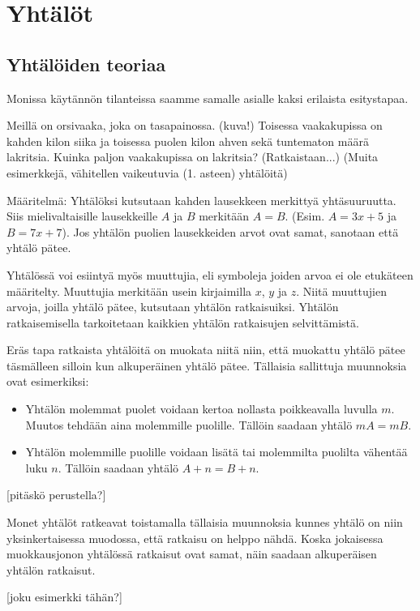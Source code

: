 %
\part{Yhtälöt}
\chapter{Yhtälöiden teoriaa}
Monissa käytännön tilanteissa saamme samalle asialle kaksi erilaista esitystapaa.

\begin{esimerkki}
Meillä on orsivaaka, joka on tasapainossa. (kuva!) Toisessa vaakakupissa on kahden kilon siika ja toisessa puolen kilon ahven sekä tuntematon määrä lakritsia. Kuinka paljon vaakakupissa on lakritsia? (Ratkaistaan...) (Muita esimerkkejä, vähitellen vaikeutuvia (1. asteen) yhtälöitä)
\end{esimerkki}

Määritelmä: Yhtälöksi kutsutaan kahden lausekkeen merkittyä yhtäsuuruutta. Siis mielivaltaisille lausekkeille $A$ ja $B$ merkitään $A=B$. (Esim. $A=3x+5$ ja $B=7x+7$). Jos yhtälön puolien lausekkeiden arvot ovat samat, sanotaan että yhtälö pätee. 

Yhtälössä voi esiintyä myös muuttujia, eli symboleja joiden arvoa ei ole etukäteen määritelty. Muuttujia merkitään usein kirjaimilla $x$, $y$ ja $z$. Niitä muuttujien arvoja, joilla yhtälö pätee, kutsutaan yhtälön ratkaisuiksi. Yhtälön ratkaisemisella tarkoitetaan kaikkien yhtälön ratkaisujen selvittämistä.

Eräs tapa ratkaista yhtälöitä on muokata niitä niin, että muokattu yhtälö pätee täsmälleen silloin kun alkuperäinen yhtälö pätee. Tällaisia sallittuja muunnoksia ovat esimerkiksi:
\begin{itemize}
\item Yhtälön molemmat puolet voidaan kertoa nollasta poikkeavalla luvulla $m$. Muutos tehdään aina molemmille puolille. Tällöin saadaan yhtälö $mA = mB$.
\item Yhtälön molemmille puolille voidaan lisätä tai molemmilta puolilta vähentää luku $n$.
Tällöin saadaan yhtälö $A+n = B+n$.
\end{itemize}
[pitäskö perustella?]

Monet yhtälöt ratkeavat toistamalla tällaisia muunnoksia kunnes yhtälö on niin yksinkertaisessa muodossa, että ratkaisu on helppo nähdä. Koska jokaisessa muokkausjonon yhtälössä ratkaisut ovat samat, näin saadaan alkuperäisen yhtälön ratkaisut.

[joku esimerkki tähän?]

